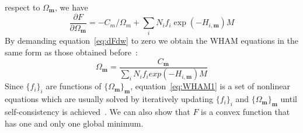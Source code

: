 respect to $\Omega_{\mathbf{m}}$, we have
\begin{equation}
\frac{\partial F}{\partial \Omega_{\mathbf{m}}} = -C_{m}/\Omega_{m} + \sum_{i}^{} N_{i} f_{i} \exp(-H_{i,\mathbf{m}}) M
\label{eq:dFdw}
\end{equation}
By demanding equation~\ref{eq:dFdw} to zero we obtain the WHAM equations in the same form 
as those obtained before~\cite{Zhu2012,Chodera2007,Kumar1992}:
\begin{equation}
\Omega_{\mathbf{m}} = \frac{C_{\mathbf{m}}}{\sum\limits_{i}^{} N_{i} f_{i} exp(-H_{i,\mathbf{m}}) M}
\label{eq:WHAM1}
\end{equation}
Since $\{f_{i}\}_{i}$ are functions of $\{\Omega_{\mathbf{m}}\}_{\mathbf{m}}$, equation~\ref{eq:WHAM1}
is a set of nonlinear equations which are usually solved by iteratively updating 
$\{f_{i}\}_{i}$ and $\{\Omega_{\mathbf{m}}\}_{\mathbf{m}}$ until self-consistency is 
achieved~\cite{Kumar1992,wham205}. We can also show that $F$ is a convex function that 
has one and only one global minimum.

